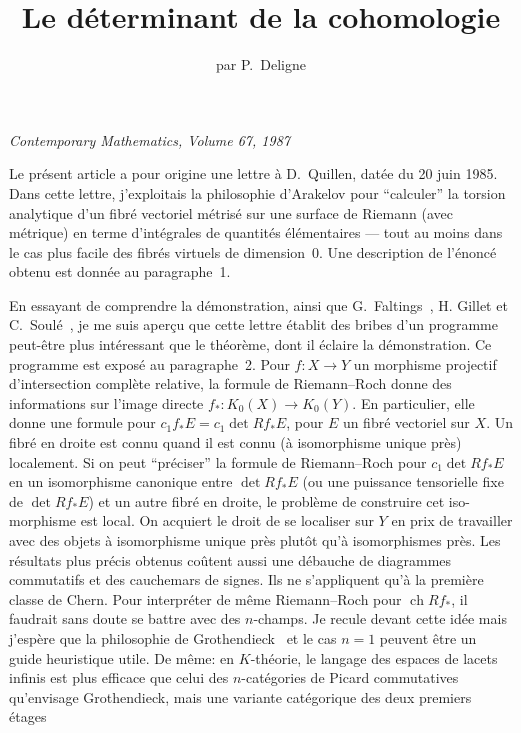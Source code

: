 \documentclass[12pt,a4paper]{article}
\title{\textbf{Le d\'eterminant de la cohomologie}}
\author{par P.~Deligne}
\date{}
\theoremstyle{plain}
\theoremstyle{definition}
\DeclareMathOperator{\ch}{ch}
\begin{document}
\maketitle

\thispagestyle{empty}

\begin{center}
\textit{Contemporary Mathematics, Volume 67, 1987}
\end{center}

\bigskip

Le pr\'esent article a pour origine une lettre \`a D.~Quillen, dat\'ee du 20 juin
1985. Dans cette lettre, j'exploitais la philosophie d'Arakelov pour ``calculer''
la torsion analytique d'un fibr\'e vectoriel m\'etris\'e sur une surface de Riemann
(avec m\'etrique) en terme d'int\'egrales de quantit\'es \'el\'ementaires --- tout au moins
dans le cas plus facile des fibr\'es virtuels de dimension~0. Une description
de l'\'enonc\'e obtenu est donn\'ee au paragraphe~1.

En essayant de comprendre la d\'emonstration, ainsi que G.~Faltings~\cite{5}, H.
Gillet et C.~Soul\'e~\cite{7}, je me suis aper\c{c}u que cette lettre \'etablit des bribes
d'un programme peut-\^etre plus int\'eressant que le th\'eor\`eme, dont il \'eclaire la
d\'emonstration. Ce programme est expos\'e au paragraphe~2. Pour $f:X \to Y$ un
morphisme projectif d'intersection compl\`ete relative, la formule de Riemann--Roch
donne des informations sur l'image directe $f_*: K_0(X) \to K_0(Y)$. En particulier,
elle donne une formule pour $c_1 f_* E = c_1 \det Rf_* E$, pour $E$ un fibr\'e vectoriel sur
$X$. Un fibr\'e en droite est connu quand il est connu (\`a isomorphisme unique pr\`es)
localement. Si on peut ``pr\'eciser'' la formule de Riemann--Roch pour $c_1 \det Rf_* E$
en un isomorphisme canonique entre $\det Rf_* E$ (ou une puissance tensorielle fixe
de $\det Rf_* E$) et un autre fibr\'e en droite, le probl\`eme de construire cet iso-
morphisme est local. On acquiert le droit de se localiser sur $Y$ en prix de
travailler avec des objets \`a isomorphisme unique pr\`es plut\^ot qu'\`a isomorphismes
pr\`es. Les r\'esultats plus pr\'ecis obtenus co\^utent aussi une d\'ebauche de diagrammes
commutatifs et des cauchemars de signes. Ils ne s'appliquent qu'\`a la premi\`ere
classe de Chern. Pour interpr\'eter de m\^eme Riemann--Roch pour $\ch Rf_*$, il faudrait
sans doute se battre avec des $n$-champs. Je recule devant cette id\'ee mais j'esp\`ere
que la philosophie de Grothendieck~\cite{9} et le cas $n=1$ peuvent \^etre un guide
heuristique utile. De m\^eme: en $K$-th\'eorie, le langage des espaces de lacets
infinis est plus efficace que celui des $n$-cat\'egories de Picard commutatives
qu'envisage Grothendieck, mais une variante cat\'egorique des deux premiers \'etages
\end{document}

